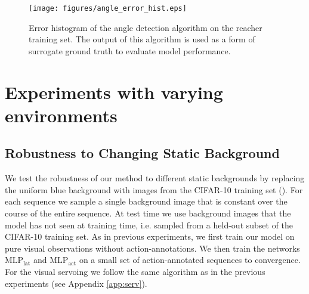\documentclass{article} %
\begin{document}
\begin{figure}
  \centering
  \texttt{[image: figures/angle\_error\_hist.eps]} 
  \caption{Error histogram of the angle detection algorithm on the reacher training set. The output of this algorithm is used as a form of surrogate ground truth to evaluate model performance.}
  \label{fig:angle_error}
\end{figure}\section{Experiments with varying environments}\label{app:vary}\subsection{Robustness to Changing Static Background}

We test the robustness of our method to different static backgrounds by replacing the uniform blue background with images from the CIFAR-10 training set (\cite{krizhevsky2009LearningML}). For each sequence we sample a single background image that is constant over the course of the entire sequence. At test time we use background images that the model has not seen at training time, i.e. sampled from a held-out subset of the CIFAR-10 training set. As in previous experiments, we first train our model on pure visual observations without action-annotations. We then train the networks $\text{MLP}_\text{lat}$ and $\text{MLP}_\text{act}$ on a small set of action-annotated sequences to convergence. For the visual servoing we follow the same algorithm as in the previous experiments (see Appendix \ref{app:serv}).
\end{document}
